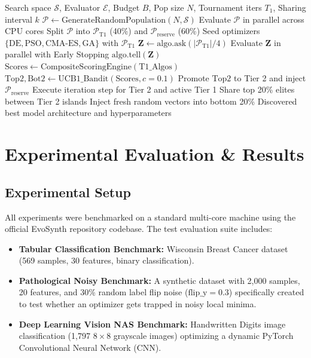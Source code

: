\documentclass[conference]{IEEEtran}
\begin{document}
\begin{algorithm}[t]
\caption{EvoSynth Complete Optimization Lifecycle}
\label{alg:evosynth}
\begin{algorithmic}[1]
\REQUIRE Search space $\mathcal{S}$, Evaluator $\mathcal{E}$, Budget $B$, Pop size $N$, Tournament iters $T_1$, Sharing interval $k$
\STATE $\mathcal{P} \leftarrow \text{GenerateRandomPopulation}(N, \mathcal{S})$
\STATE Evaluate $\mathcal{P}$ in parallel across CPU cores
\STATE Split $\mathcal{P}$ into $\mathcal{P}_{\text{T1}}$ (40\%) and $\mathcal{P}_{\text{reserve}}$ (60\%)
\STATE Seed optimizers $\{\text{DE}, \text{PSO}, \text{CMA-ES}, \text{GA}\}$ with $\mathcal{P}_{\text{T1}}$
        \STATE $\mathbf{Z} \leftarrow \text{algo.ask}(|\mathcal{P}_{\text{T1}}|/4)$
        \STATE Evaluate $\mathbf{Z}$ in parallel with Early Stopping
        \STATE $\text{algo.tell}(\mathbf{Z})$
    \ENDFOR
\ENDFOR
\STATE $\text{Scores} \leftarrow \text{CompositeScoringEngine}(\text{T1\_Algos})$
\STATE $\text{Top2}, \text{Bot2} \leftarrow \text{UCB1\_Bandit}(\text{Scores}, c=0.1)$
\STATE Promote $\text{Top2}$ to Tier 2 and inject $\mathcal{P}_{\text{reserve}}$
    \STATE Execute iteration step for Tier 2 and active Tier 1
        \STATE Share top 20\% elites between Tier 2 islands
            \STATE Inject fresh random vectors into bottom 20\%
        \ENDIF
    \ENDIF
\ENDWHILE
\RETURN Discovered best model architecture and hyperparameters
\end{algorithmic}
\end{algorithm}

\section{Experimental Evaluation & Results}

\subsection{Experimental Setup}
All experiments were benchmarked on a standard multi-core machine using the official EvoSynth repository codebase. The test evaluation suite includes:
\begin{itemize}
    \item \textbf{Tabular Classification Benchmark:} Wisconsin Breast Cancer dataset (569 samples, 30 features, binary classification).
    \item \textbf{Pathological Noisy Benchmark:} A synthetic dataset with 2,000 samples, 20 features, and 30\% random label flip noise ($\text{flip\_y}=0.3$) specifically created to test whether an optimizer gets trapped in noisy local minima.
    \item \textbf{Deep Learning Vision NAS Benchmark:} Handwritten Digits image classification (1,797 $8\times8$ grayscale images) optimizing a dynamic PyTorch Convolutional Neural Network (CNN).
\end{itemize}
\end{document}
